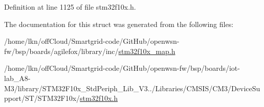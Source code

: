 Definition at line 1125 of file stm32f10x.\+h.



The documentation for this struct was generated from the following files\+:\begin{DoxyCompactItemize}
\item 
/home/lkn/off\+Cloud/\+Smartgrid-\/code/\+Git\+Hub/openwsn-\/fw/bsp/boards/agilefox/library/inc/\hyperlink{agilefox_2library_2inc_2stm32f10x__map_8h}{stm32f10x\+\_\+map.\+h}\item 
/home/lkn/off\+Cloud/\+Smartgrid-\/code/\+Git\+Hub/openwsn-\/fw/bsp/boards/iot-\/lab\+\_\+\+A8-\/\+M3/library/\+S\+T\+M32\+F10x\+\_\+\+Std\+Periph\+\_\+\+Lib\+\_\+\+V3../\+Libraries/\+C\+M\+S\+I\+S/\+C\+M3/\+Device\+Support/\+S\+T/\+S\+T\+M32\+F10x/\hyperlink{iot-lab___a8-_m3_2library_2_s_t_m32_f10x___std_periph___lib___v3_85_80_2_libraries_2_c_m_s_i_s_26497265545392eb5694b064ae15018db}{stm32f10x.\+h}\end{DoxyCompactItemize}
